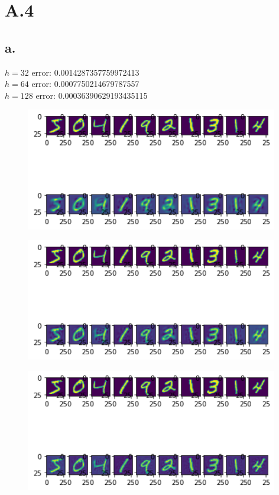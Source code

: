 \documentclass{article}
\newcommand{\1}{\mathbf{1}}
\begin{document}
\section*{A.4}
{\Large 
\subsection*{a.}

$h = 32$ error: 0.0014287357759972413 \\
$h = 64$ error: 0.0007750214679787557 \\
$h = 128$ error: 0.00036390629193435115 \\

\begin{figure}[!hb]
  \centering
  \includegraphics[width=110mm]{../hw4-code/results/a4_a32.png}
\end{figure}

\begin{figure}[!hb]
  \centering
  \includegraphics[width=110mm]{../hw4-code/results/a4_a64.png}
\end{figure}

\begin{figure}[!hb]
  \centering
  \includegraphics[width=110mm]{../hw4-code/results/a4_a128.png}
\end{figure}

}
\end{document}
